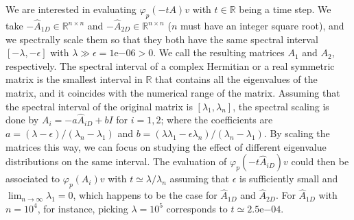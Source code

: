 We are interested in evaluating $\varphi_p(-tA) v$ with $t \in \mathbb{R}$ being a time step.
We take $-\hat{A}_{1D} \in \mathbb{R}^{n \times n}$ and $-\hat{A}_{2D} \in \mathbb{R}^{n \times n}$
($n$ must have an integer square root), and we spectrally scale them so that they both have the
same spectral interval $[-\lambda, -\epsilon]$ with $\lambda \gg \epsilon = 1\mathrm{e}{-06} > 0$.
We call the resulting matrices $A_1$ and $A_2$, respectively.
The spectral interval of a complex Hermitian or a real symmetric matrix is the smallest
interval in $\mathbb{R}$ that contains all the eigenvalues of the matrix, and it coincides
with the numerical range of the matrix.
Assuming that the spectral interval of the original matrix is $[\lambda_1, \lambda_n]$,
the spectral scaling is done by $A_i = -a \hat{A}_{iD} + b I$ for $i = 1, 2$; where the coefficients
are $a = (\lambda - \epsilon) / (\lambda_n - \lambda_1)$ and
$b = (\lambda \lambda_1 - \epsilon \lambda_n) / (\lambda_n - \lambda_1)$.
By scaling the matrices this way, we can focus on studying the effect of different eigenvalue
distributions on the same interval. The evaluation of $\varphi_p(-t\hat{A}_{iD}) v$ could then be
associated to $\varphi_p(A_i) v$ with $t \simeq \lambda / \lambda_n$ assuming that $\epsilon$
is sufficiently small and $\lim_{n \to \infty}\lambda_1 = 0$,
which happens to be the case for $\hat{A}_{1D}$ and $\hat{A}_{2D}$. For $\hat{A}_{1D}$ with
$n = 10^4$, for instance, picking $\lambda = 10^5$ corresponds to $t \simeq 2.5\mathrm{e}{-04}$.


